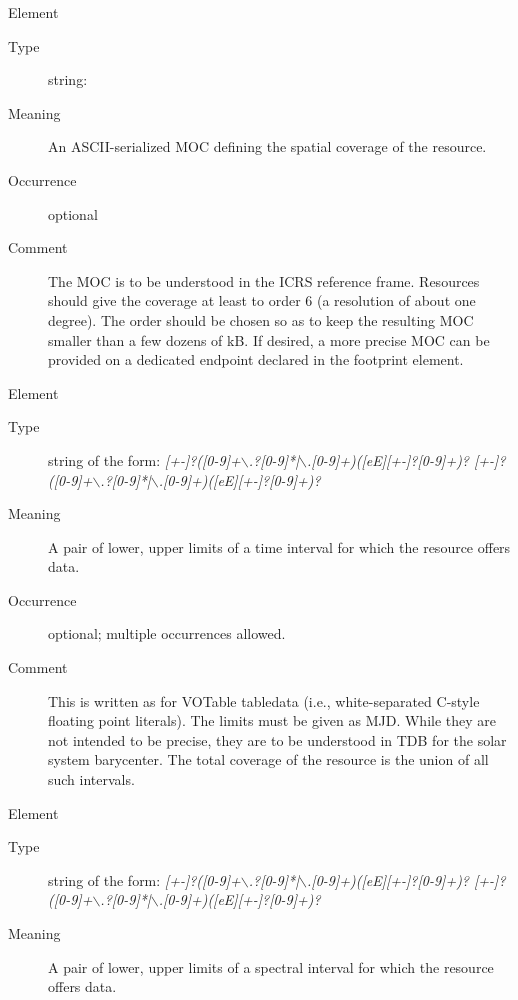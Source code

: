 \documentclass[11pt,a4paper]{ivoa}
\begin{document}
\begin{generated}
\begin{bigdescription}
\begin{description}
\end{description}
\item[Element \xmlel{spatial}]
\begin{description}
\item[Type] string: 
\item[Meaning] 
                  An ASCII-serialized MOC defining the spatial coverage 
                  of the resource.
               
\item[Occurrence] optional
\item[Comment] 
                  The MOC is to be understood in the ICRS reference frame.
                  Resources should give the coverage at least to order 6
                  (a resolution of about one degree).  The order should be
                  chosen so as to keep the resulting MOC smaller than a few
                  dozens of kB.  If desired, a more precise MOC can be provided
                  on a dedicated endpoint declared in the footprint element.
               

\end{description}
\item[Element \xmlel{temporal}]
\begin{description}
\item[Type] string of the form: \emph{[+-]?([0-9]+$\backslash$.?[0-9]*|$\backslash$.[0-9]+)([eE][+-]?[0-9]+)? [+-]?([0-9]+$\backslash$.?[0-9]*|$\backslash$.[0-9]+)([eE][+-]?[0-9]+)?}
\item[Meaning] 
                  A pair of lower, upper limits of a time interval 
                  for which the resource offers data.
               
\item[Occurrence] optional; multiple occurrences allowed.

\item[Comment] 
                  This is written as for VOTable tabledata (i.e., 
                  white-separated C-style floating point literals).
                  The limits must be given as MJD.  While they
                  are not intended to be precise, they are to be understood
                  in TDB for the solar system barycenter.  The total coverage
                  of the resource is the union of all such intervals.
               

\end{description}
\item[Element \xmlel{spectral}]
\begin{description}
\item[Type] string of the form: \emph{[+-]?([0-9]+$\backslash$.?[0-9]*|$\backslash$.[0-9]+)([eE][+-]?[0-9]+)? [+-]?([0-9]+$\backslash$.?[0-9]*|$\backslash$.[0-9]+)([eE][+-]?[0-9]+)?}
\item[Meaning] 
                  A pair of lower, upper limits of a spectral interval 
                  for which the resource offers data.
               

\end{description}
\end{bigdescription}
\end{generated}
\end{document}
